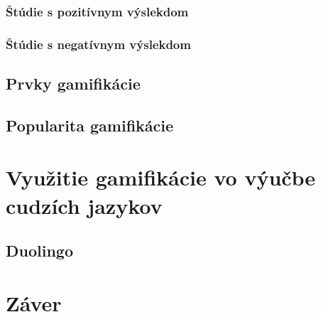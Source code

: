 \documentclass[10pt,oneside,slovak,a4paper]{article}
\begin{document}
\subsubsection{Štúdie s pozitívnym výslekdom} \label{pozit}
\subsubsection{Štúdie s negatívnym výslekdom} \label{negat}
\subsection{Prvky gamifikácie}
\subsection{Popularita gamifikácie}



\section{Využitie gamifikácie vo výučbe cudzích jazykov} \label{use}
\subsection{Duolingo} \label{duolingo}

\section{Záver} \label{zaver}





\end{document}

